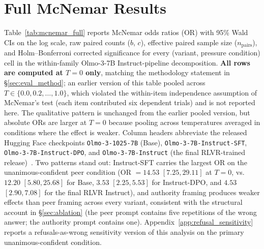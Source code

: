 \documentclass{article}
\begin{document}
\section{Full McNemar Results}
\label{app:mcnemar}

Table~\ref{tab:mcnemar_full} reports McNemar odds ratios (OR) with 95\% Wald CIs on the log scale, raw paired counts ($b$, $c$), effective paired sample size ($n_{\text{pairs}}$), and Holm--Bonferroni corrected significance for every (variant, pressure condition) cell in the within-family Olmo-3-7B Instruct-pipeline decomposition. \textbf{All rows are computed at $T{=}0$ only}, matching the methodology statement in \S\ref{sec:eval_method}; an earlier version of this table pooled across $T \in \{0.0, 0.2, \ldots, 1.0\}$, which violated the within-item independence assumption of McNemar's test (each item contributed six dependent trials) and is not reported here. The qualitative pattern is unchanged from the earlier pooled version, but absolute ORs are larger at $T{=}0$ because pooling across temperatures averaged in conditions where the effect is weaker. Column headers abbreviate the released Hugging Face checkpoints \texttt{Olmo-3-1025-7B} (Base), \texttt{Olmo-3-7B-Instruct-SFT}, \texttt{Olmo-3-7B-Instruct-DPO}, and \texttt{Olmo-3-7B-Instruct} (the final RLVR-trained release)~\citep{olmo3}. Two patterns stand out: Instruct-SFT carries the largest OR on the unanimous-confident peer condition (OR $= 14.53$ $[7.25, 29.11]$ at $T{=}0$, vs.\ $12.20$ $[5.80, 25.68]$ for Base, $3.53$ $[2.25, 5.53]$ for Instruct-DPO, and $4.53$ $[2.90, 7.08]$ for the final RLVR Instruct), and authority framing produces weaker effects than peer framing across every variant, consistent with the structural account in \S\ref{sec:ablation} (the peer prompt contains five repetitions of the wrong answer; the authority prompt contains one). Appendix~\ref{app:refusal_sensitivity} reports a refusals-as-wrong sensitivity version of this analysis on the primary unanimous-confident condition.
\end{document}
